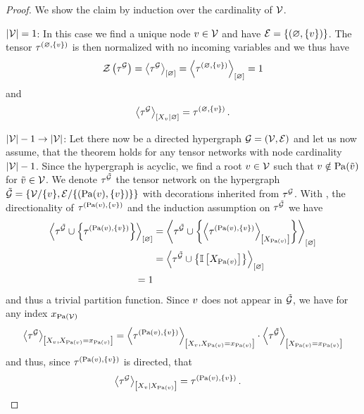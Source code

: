 \begin{proof}
    We show the claim by induction over the cardinality of $\mathcal{V}$.

    $\left|\mathcal{V}\right|=1$: In this case we find a unique node $v\in\mathcal{V}$ and have $\mathcal{E}=\{(\varnothing,\{v\})\}$.
    The tensor $\tau^{(\varnothing,\{v\})}$ is then normalized with no incoming variables and we thus have
    \[ \mathcal{Z}\left(\tau^{\mathcal{G}}\right) = \left\langle \tau^{\mathcal{G}}\right\rangle_{\left[ \varnothing \right]} = \left\langle \tau^{(\varnothing,\{v\})}\right\rangle_{\left[ \varnothing \right]} = 1 \]
    and
    \[ \left\langle \tau^{\mathcal{G}}\right\rangle_{\left[ X_{v} | \varnothing \right]} = \tau^{(\varnothing,\{v\})} \, .  \]

    $\left|\mathcal{V}\right|-1 \rightarrow \left|\mathcal{V}\right|$: Let there now be a directed hypergraph $\mathcal{G}=(\mathcal{V},\mathcal{E})$ and let us now assume, that the theorem holds for any tensor networks with node cardinality $\left|\mathcal{V}\right|-1$.
    Since the hypergraph is acyclic, we find a root $v\in\mathcal{V}$ such that $v\notin\mathrm{Pa}(\tilde{v})$ for $\tilde{v}\in\mathcal{V}$.
    We denote $\tau^{\tilde{\mathcal{G}}}$ the tensor network on the hypergraph $\tilde{\mathcal{G}}=\{\mathcal{V}/\{v\},\mathcal{E}/\{(\mathrm{Pa}(v),\{v\})\}\}$ with decorations inherited from $\tau^{\mathcal{G}}$.
    With , the directionality of $\tau^{(\mathrm{Pa}(v),\{v\})}$ and the induction assumption on $\tau^{\tilde{\mathcal{G}}}$ we have
    \begin{align*}
        \left\langle \tau^{\tilde{\mathcal{G}}}\cup\left\{\tau^{(\mathrm{Pa}(v),\{v\})}\right\}\right\rangle_{\left[ \varnothing \right]}
        &= \left\langle \tau^{\tilde{\mathcal{G}}}\cup\left\{\left\langle \tau^{(\mathrm{Pa}(v),\{v\})}\right\rangle_{\left[ X_{\mathrm{Pa}(v)} \right]}\right\}\right\rangle_{\left[ \varnothing \right]} \\
        &= \left\langle \tau^{\tilde{\mathcal{G}}}\cup\left\{\mathbb{I}\left[X_{\mathrm{Pa}(v)}\right]\right\}\right\rangle_{\left[ \varnothing \right]} \\
        = 1
    \end{align*}
    and thus a trivial partition function.
    Since $v$ does not appear in $\tilde{\mathcal{G}}$, we have for any index $x_{\mathrm{Pa}(\mathcal{V})}$
    \begin{align*}
        \left\langle \tau^{\mathcal{G}}\right\rangle_{\left[ X_{v},X_{\mathrm{Pa}(v)}=x_{\mathrm{Pa}(v)} \right]}
        = \left\langle \tau^{(\mathrm{Pa}(v),\{v\})}\right\rangle_{\left[ X_{v},X_{\mathrm{Pa}(v)}=x_{\mathrm{Pa}(v)} \right]}
        \cdot \left\langle \tau^{\tilde{\mathcal{G}}}\right\rangle_{\left[ X_{\mathrm{Pa}(v)}=x_{\mathrm{Pa}(v)} \right]}
    \end{align*}
    and thus, since $\tau^{(\mathrm{Pa}(v),\{v\})}$ is directed, that
    \begin{align*}
        \left\langle \tau^{\mathcal{G}}\right\rangle_{\left[ X_{v} | X_{\mathrm{Pa}(v)} \right]}
        = \tau^{(\mathrm{Pa}(v),\{v\})} \, . & \qedhere
    \end{align*}
\end{proof}

